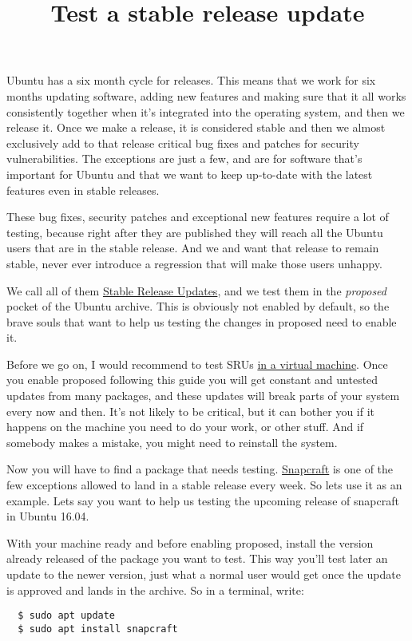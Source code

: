 \documentclass[12pt]{article}
\title{Test a stable release update}
\begin{document}
Ubuntu has a six month cycle for releases. This means that we work for six
months updating software, adding new features and making sure that it all works
consistently together when it's integrated into the operating system, and then
we release it. Once we make a release, it is considered stable and then we
almost exclusively add to that release critical bug fixes and patches for security
vulnerabilities. The exceptions are just a few, and are for software that's
important for Ubuntu and that we want to keep up-to-date with the latest
features even in stable releases.

These bug fixes, security patches and exceptional new features require a lot of
testing, because right after they are published they will reach all the Ubuntu
users that are in the stable release. And we and want that release to remain
stable, never ever introduce a regression that will make those users unhappy.

We call all of them
\href{https://wiki.ubuntu.com/StableReleaseUpdates}{Stable Release Updates},
and we test them in the \emph{proposed} pocket of the Ubuntu archive. This is
obviously not enabled by default, so the brave souls that want to help us
testing the changes in proposed need to enable it.

Before we go on, I would recommend to test SRUs
\href{http://elopio.net/blog/install-ubuntu-in-vm/}
     {in a virtual machine}.
Once you enable proposed following this guide you will get constant and untested
updates from many packages, and these updates will break parts of your system
every now and then. It's not likely to be critical, but it can bother you if it
happens on the machine you need to do your work, or other stuff. And if
somebody makes a mistake, you might need to reinstall the system.

Now you will have to find a package that needs testing.
\href{http://snapcraft.io}{Snapcraft} is one of the few exceptions allowed to
land in a stable release every week. So lets use it as an example. Lets say you
want to help us testing the upcoming release of snapcraft in Ubuntu 16.04.

With your machine ready and before enabling proposed, install the version
already released of the package you want to test. This way you'll test later an
update to the newer version, just what a normal user would get once the update
is approved and lands in the archive. So in a terminal, write:

\begin{verbatim}
  $ sudo apt update
  $ sudo apt install snapcraft
\end{verbatim}
\end{document}
